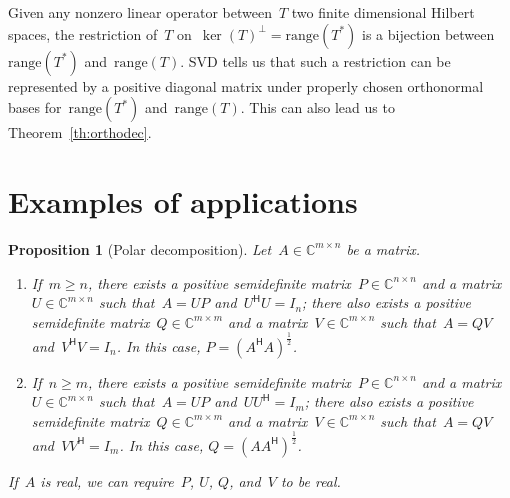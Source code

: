 \documentclass[11pt,a4paper]{article}  %
\numberwithin{equation}{section}
\newtheorem{proposition}{Proposition}%
\theoremstyle{definition}
\def\CC{\mathbb{C}}
\newcommand{\hmt}{{\scriptscriptstyle{{\mathsf{H}}}}}
\newcommand{\range}{\mathrm{range}}
\begin{document}
Given any nonzero linear operator between~$T$ two finite dimensional Hilbert spaces, the restriction
of~$T$ on~$\ker(T)^\perp = \range(T^*)$ is a bijection between~$\range(T^*)$ and~$\range(T)$.
SVD tells us that such a restriction can be represented by a positive diagonal matrix under properly
chosen orthonormal bases for~$\range(T^*)$ and~$\range(T)$.
This can also lead us to Theorem~\ref{th:orthodec}.


\section{Examples of applications}

\begin{proposition}[Polar decomposition]
  \label{th:polar} Let~$A \in \CC^{m\times n}$ be a matrix.
  \begin{enumerate}[leftmargin=1.5em]
    \item If~$m\ge n$, there exists a positive semidefinite matrix~$P \in \CC^{n\times n}$ and
      a matrix~$U\in \CC^{m\times n}$ such that~$A = UP$ and~$U^\hmt U = I_n$; there also exists
      a positive semidefinite matrix~$Q\in \CC^{m\times m}$ and a matrix~$V\in\CC^{m\times n}$ such
      that~$A = QV$ and~$V^\hmt V = I_n$.
      In this case, $P = (A^\hmt A)^{\frac{1}{2}}$.
    \item If~$n\ge m$, there exists a positive semidefinite matrix~$P \in \CC^{n\times n}$ and
      a matrix~$U\in \CC^{m\times n}$ such that~$A = UP$ and~$UU^\hmt = I_m$; there also exists
      a positive semidefinite matrix~$Q\in \CC^{m\times m}$ and a matrix~$V\in\CC^{m\times n}$ such
      that~$A = QV$ and~$V V^\hmt = I_m$. In this case, $Q = (AA^\hmt)^{\frac{1}{2}}$.
  \end{enumerate}
   If~$A$ is real, we can require~$P$, $U$, $Q$, and~$V$ to be real.
\end{proposition}
\end{document}
